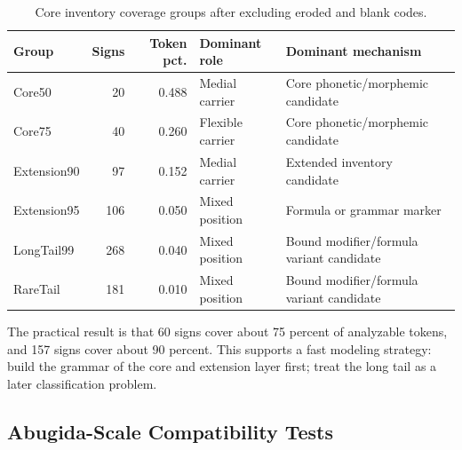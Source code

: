 \begin{table}[htbp]
\centering
\begin{tabular}{lrrll}
\toprule
\textbf{Group} & \textbf{Signs} & \textbf{Token pct.} & \textbf{Dominant role} & \textbf{Dominant mechanism} \\
\midrule
Core50 & 20 & 0.488 & Medial carrier & Core phonetic/morphemic candidate \\
Core75 & 40 & 0.260 & Flexible carrier & Core phonetic/morphemic candidate \\
Extension90 & 97 & 0.152 & Medial carrier & Extended inventory candidate \\
Extension95 & 106 & 0.050 & Mixed position & Formula or grammar marker \\
LongTail99 & 268 & 0.040 & Mixed position & Bound modifier/formula variant candidate \\
RareTail & 181 & 0.010 & Mixed position & Bound modifier/formula variant candidate \\
\bottomrule
\end{tabular}
\caption{Core inventory coverage groups after excluding eroded and blank codes.}
\label{tab:core-inventory-groups}
\end{table}

The practical result is that 60 signs cover about 75 percent of analyzable tokens, and 157 signs cover about 90 percent. This supports a fast modeling strategy: build the grammar of the core and extension layer first; treat the long tail as a later classification problem.

\subsection{Abugida-Scale Compatibility Tests}

